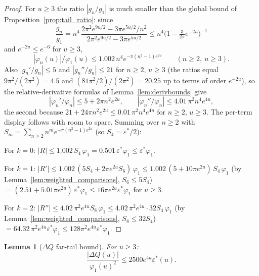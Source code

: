 \documentclass[11pt]{article}
\newtheorem{lemma}[theorem]{Lemma}
\theoremstyle{definition}
\theoremstyle{remark}
\begin{document}
\begin{proof}
For $u \geq 3$ the ratio $|g_n/g_1|$ is much smaller than the global
bound of Proposition~\ref{prop:tail_ratio}: since
\[
\frac{g_n}{g_1}
= n^4\,\frac{2\pi^2 e^{9u/2} - 3\pi e^{5u/2}/n^2}
            {2\pi^2 e^{9u/2} - 3\pi e^{5u/2}}
\leq n^4 \bigl(1 - \tfrac{3}{2\pi} e^{-2u}\bigr)^{-1}
\]
and $e^{-2u} \leq e^{-6}$ for $u \geq 3$,
\[
|\varphi_n(u)|/\varphi_1(u) \leq 1.002\, n^4 e^{-\pi(n^2-1)e^{2u}}
\qquad (n \geq 2,\ u \geq 3).
\]
Also $|g_n'/g_n| \leq 5$ and $|g_n''/g_n| \leq 21$ for $n \geq 2$,
$u \geq 3$ (the ratios equal $9\pi^2/(2\pi^2) = 4.5$ and
$(81\pi^2/2)/(2\pi^2) = 20.25$ up to terms of order $e^{-2u}$), so the
relative-derivative formulas of Lemma~\ref{lem:derivbounds} give
\[
|\varphi_n'/\varphi_n| \leq 5 + 2\pi n^2 e^{2u},
\qquad
|\varphi_n''/\varphi_n| \leq 4.01\,\pi^2 n^4 e^{4u},
\]
the second because $21 + 24\pi n^2 e^{2u} \leq 0.01\,\pi^2 n^4 e^{4u}$
for $n \geq 2$, $u \geq 3$.
The per-term display follows with room to spare.
Summing over $n \geq 2$ with
$S_m = \sum_{n\ge2} n^m e^{-\pi(n^2-1)e^{2u}}$ (so $S_4 = \varepsilon^*/2$):

For $k=0$: $|R| \leq 1.002\, S_4\, \varphi_1
= 0.501\,\varepsilon^*\varphi_1 \leq \varepsilon^*\varphi_1$.

For $k=1$: $|R'| \leq 1.002\,(5S_4 + 2\pi e^{2u} S_6)\,\varphi_1
\leq 1.002\,(5 + 10\pi e^{2u})\,S_4\,\varphi_1$
(by Lemma~\ref{lem:weighted_comparisons}, $S_6 \leq 5S_4$)
$= (2.51 + 5.01\pi e^{2u})\,\varepsilon^*\varphi_1
\leq 16\pi e^{2u}\varepsilon^*\varphi_1$ for $u \geq 3$.

For $k=2$: $|R''| \leq 4.02\,\pi^2 e^{4u} S_8\,\varphi_1
\leq 4.02\,\pi^2 e^{4u}\cdot 32 S_4\,\varphi_1$
(by Lemma~\ref{lem:weighted_comparisons}, $S_8 \leq 32S_4$)
$= 64.32\,\pi^2 e^{4u}\varepsilon^*\varphi_1
\leq 128\pi^2 e^{4u}\varepsilon^*\varphi_1$.
\end{proof}

\begin{lemma}[$\Delta Q$ far-tail bound]\label{lem:fartail_deltaQ}
For $u\geq 3$:
\[
\frac{|\Delta Q(u)|}{\varphi_1(u)^2} \leq 2500 e^{4u}\varepsilon^*(u).
\]
\end{lemma}
\end{document}
